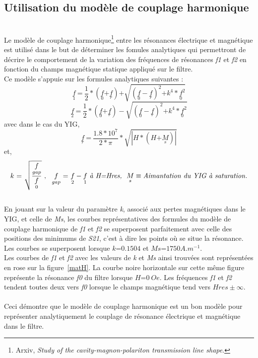 \documentclass[12pt,fleqn]{book} %
\begin{document}
\subsection{Utilisation du modèle de couplage harmonique}
~\\
\noindent Le modèle de couplage harmonique\footnote{Arxiv, \emph{Study of the cavity-magnon-polariton transmission line shape}.} entre les résonances électrique et magnétique est utilisé dans le but de déterminer les fomules analytiques qui permettront de décrire le comportement de la variation des fréquences de résonances \emph{f1} et \emph{f2} en fonction du champs magnétique statique appliqué sur le filtre. 
~\\Ce modèle s'appuie sur les formules analytiques suivantes :
$$\underset{1}{f}\ \text{=}\ \frac{1}{2}*(\underset{0}{f}\text{+}\underset{r}{f})\text{+}\sqrt{(\underset{0}{f}-\underset{r}{f})^{2}\text{+}k^4*\underset{0}{f}^2}$$
$$\underset{2}{f}\ \text{=}\ \frac{1}{2}*(\underset{0}{f}\text{+}\underset{r}{f})-\sqrt{(\underset{0}{f}-\underset{r}{f})^{2}\text{+}k^4*\underset{0}{f}^2}$$
avec dans le cas du YIG,
$$\underset{r}{f}\ \text{=}\ \frac{1.8*10^7}{2*\pi}*\sqrt{|H*(H\text{+}\underset{s}{M})|}$$
et,
$$k\ \text{=}\ \sqrt{\frac{\underset{gap}{f}}{\underset{0}{f}}}\ ,\ \ \underset{gap}{f}\ \text{=}\ \underset{2}{f}-\underset{1}{f}\ \text{\emph{à H=Hres,}}\ \ \underset{s}{M}\equiv\text{\emph{Aimantation du YIG à saturation.}}$$
~\\En jouant sur la valeur du paramètre \emph{k}, associé aux pertes magnétiques dans le YIG, et celle de \emph{Ms}, les courbes représentatives des formules du modèle de couplage harmonique
de \emph{f1} et \emph{f2} se superposent parfaitement avec celle des positions des minimums de \emph{S21}, c'est à dire les points où se situe la résonance. Les courbes se superposent lorsque $k\text{=}0.1504$ et $Ms\text{=}1750 A.m^{-1}$.
~\\Les courbes de \emph{f1} et \emph{f2} avec les valeurs de \emph{k} et \emph{Ms} ainsi trouvées sont représentées en rose sur la figure~\underline{\color{blue}\ref{matH}}.
La courbe noire horizontale sur cette même figure représente la résonance \emph{f0} du filtre lorsque $H\text{=}0\ Oe$. Les fréquences \emph{f1} et \emph{f2} tendent toutes deux vers \emph{f0} lorsque le champs magnétique tend vers $Hres\pm\infty$.  
~\\\\Ceci démontre que le modèle de couplage harmonique est un bon modèle pour représenter analytiquement le couplage de résonance électrique et magnétique dans le filtre.
\end{document}

